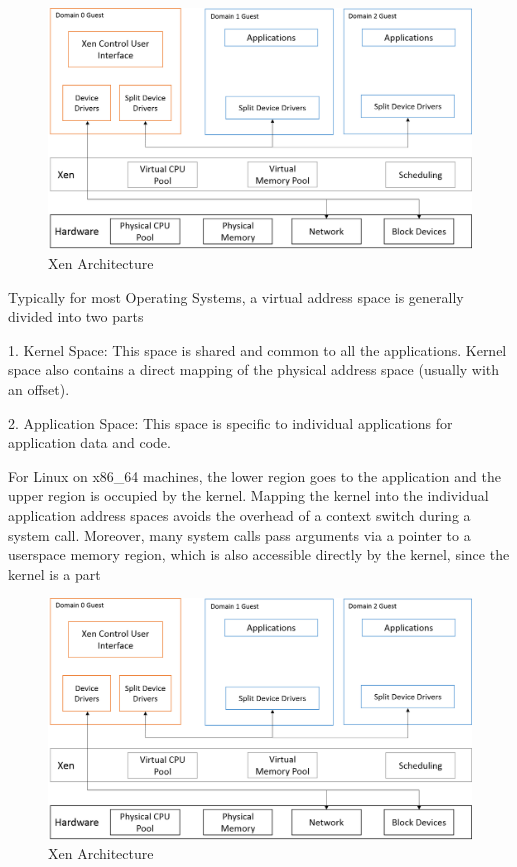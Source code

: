 \begin{figure}
\centering
\includegraphics[scale=0.6]{figures/Xen_model.png}
\caption{Xen Architecture}
\label{fig:x86_memspace}
\end{figure}

Typically for most Operating Systems, a virtual address space is generally divided into two parts 

1. Kernel Space: This space is shared and common to all the applications. Kernel space also contains a direct mapping of the physical address space (usually with an offset). 

2. Application Space: This space is specific to individual applications for application data and code. 

For Linux on x86\_64 machines, the lower region goes to the application and the upper region is occupied by the kernel. Mapping the kernel into the individual application address spaces avoids the overhead of a context switch during a system call. Moreover, many system calls pass arguments via a pointer to a userspace memory region, which is also accessible directly by the kernel, since the kernel is a part 


\begin{figure}
\centering
\includegraphics[scale=0.6]{figures/Xen_model.png}
\caption{Xen Architecture}
\label{fig:xen_layout}
\end{figure}


